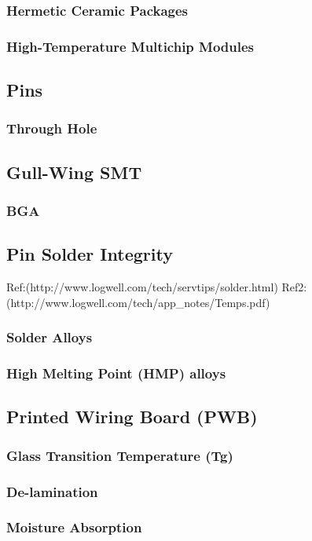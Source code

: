 \documentclass{article}
\begin{document}
	\subsubsection{Hermetic Ceramic Packages}
	\subsubsection{High-Temperature Multichip Modules}
	
\subsection{Pins}
	\subsubsection{Through Hole}
	\subsection{Gull-Wing SMT}
	\subsubsection{BGA}
	
\subsection{Pin Solder Integrity}
	Ref:(http://www.logwell.com/tech/servtips/solder.html)
	Ref2:(http://www.logwell.com/tech/app_notes/Temps.pdf)
	\subsubsection{Solder Alloys}
	\subsubsection{High Melting Point (HMP) alloys}
	
\subsection{Printed Wiring Board (PWB)}
	\subsubsection{Glass Transition Temperature (Tg)}
	\subsubsection{De-lamination}
	\subsubsection{Moisture Absorption}
\end{document}
